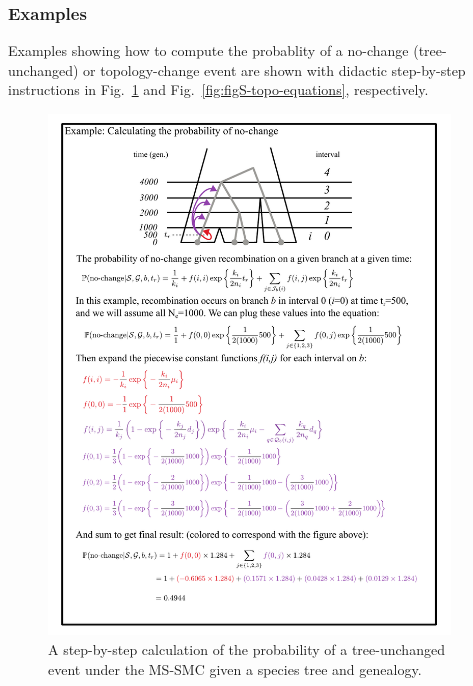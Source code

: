 \documentclass[11pt]{article}
\begin{document}
\subsubsection{Examples}
Examples showing how to compute the probablity of a no-change (tree-unchanged) 
or topology-change event are shown with didactic step-by-step instructions in 
Fig.~\ref{fig:figS-tree-equations} and Fig.~\ref{fig:figS-topo-equations}, 
respectively.

\begin{figure}[p]
	\centering
	\includegraphics[width=0.95\textwidth]{figures/verbose-equations}
	\caption{A step-by-step calculation of the probability of a tree-unchanged 
	event under the MS-SMC given a species tree and genealogy.
	}
	\label{fig:figS-tree-equations}
\end{figure}
\end{document}
